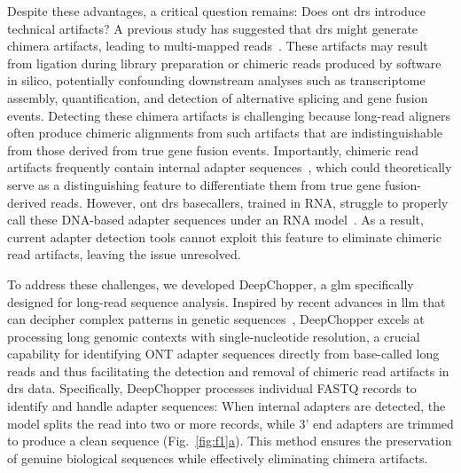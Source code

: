 \documentclass[pdflatex,sn-nature, lineno]{sn-jnl}%
\newcommand{\figref}[2]{Fig.~\hyperref[#1]{\ref*{#1}#2}}
\theoremstyle{thmstyleone}%
\theoremstyle{thmstyletwo}%
\theoremstyle{thmstylethree}%
\begin{document}
Despite these advantages, a critical question remains: Does \gls{ont} \gls{drs} introduce technical artifacts?
A previous study has suggested that \gls{drs} might generate chimera artifacts, leading to multi-mapped reads~\cite{smith2020molecular}.
These artifacts may result from ligation during library preparation or chimeric reads produced by software in silico, potentially confounding downstream analyses such as transcriptome assembly, quantification, and detection of alternative splicing and gene fusion events.
Detecting these chimera artifacts is challenging because long-read aligners often produce chimeric alignments from such artifacts that are indistinguishable from those derived from true gene fusion events.
Importantly, chimeric read artifacts frequently contain internal adapter sequences~\cite{smith2020molecular}, which could theoretically serve as a distinguishing feature to differentiate them from true gene fusion-derived reads. 
However, \gls{ont} \gls{drs} basecallers, trained in RNA, struggle to properly call these DNA-based adapter sequences under an RNA model~\cite{liu2024sequencing}.
As a result, current adapter detection tools cannot exploit this feature to eliminate chimeric read artifacts, leaving the issue unresolved.

To address these challenges, we developed DeepChopper, a \gls{glm} specifically designed for long-read sequence analysis.
Inspired by recent advances in \gls{llm} that can decipher complex patterns in genetic sequences~\cite{benegas2024genomic}, DeepChopper excels at processing long genomic contexts with single-nucleotide resolution, a crucial capability for identifying ONT adapter sequences directly from base-called long reads and thus facilitating the detection and removal of chimeric read artifacts in \gls{drs} data.
Specifically, DeepChopper processes individual FASTQ records to identify and handle adapter sequences: When internal adapters are detected, the model splits the read into two or more records, while 3' end adapters are trimmed to produce a clean sequence (\figref{fig:f1}{a}).
This method ensures the preservation of genuine biological sequences while effectively eliminating chimera artifacts. 
\end{document}
